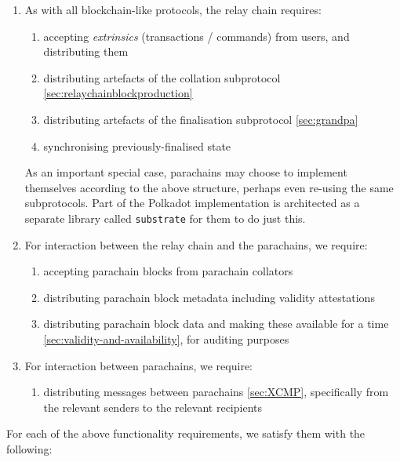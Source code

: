 \begin{enumerate}

\item As with all blockchain-like protocols, the relay chain requires:
  \begin{enumerate}
    \item accepting \emph{extrinsics} (transactions / commands) from users, and distributing them
    \item distributing artefacts of the collation subprotocol \ref{sec:relaychainblockproduction}
    \item distributing artefacts of the finalisation subprotocol \ref{sec:grandpa}
    \item synchronising previously-finalised state
  \end{enumerate}

As an important special case, parachains may choose to implement themselves
according to the above structure, perhaps even re-using the same subprotocols.
Part of the Polkadot implementation is architected as a separate library called
\texttt{substrate} for them to do just this.

\item For interaction between the relay chain and the parachains, we require:
  \begin{enumerate}
    \item accepting parachain blocks from parachain collators
    \item distributing parachain block metadata including validity attestations
    \item distributing parachain block data and making these available for a time \ref{sec:validity-and-availability}, for auditing purposes
  \end{enumerate}

\item For interaction between parachains, we require:
  \begin{enumerate}
    \item distributing messages between parachains \ref{sec:XCMP}, specifically from the relevant senders to the relevant recipients
  \end{enumerate}
\end{enumerate}

For each of the above functionality requirements, we satisfy them with the
following:

